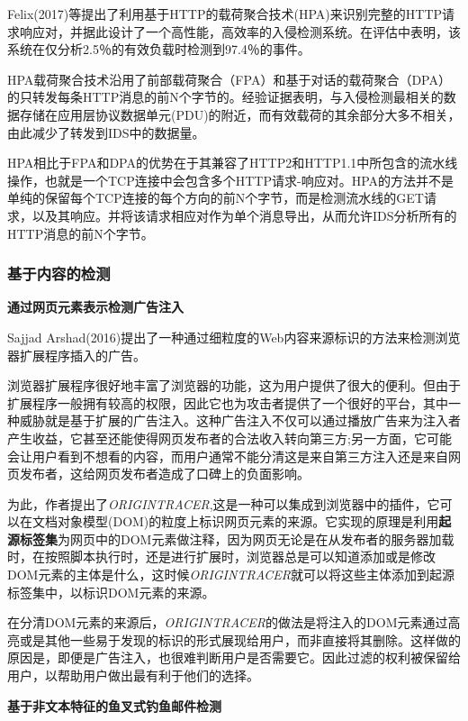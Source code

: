 \documentclass[12pt]{article} %
\begin{document}
Felix(2017)\cite{Felix}等提出了利用基于HTTP的载荷聚合技术(HPA)来识别完整的HTTP请求响应对，并据此设计了一个高性能，高效率的入侵检测系统。在评估中表明，该系统在仅分析2.5％的有效负载时检测到97.4％的事件。

HPA载荷聚合技术沿用了前部载荷聚合（FPA）和基于对话的载荷聚合（DPA）的只转发每条HTTP消息的前N个字节的。经验证据表明，与入侵检测最相关的数据存储在应用层协议数据单元(PDU)的附近，而有效载荷的其余部分大多不相关，由此减少了转发到IDS中的数据量。

HPA相比于FPA和DPA的优势在于其兼容了HTTP2和HTTP1.1中所包含的流水线操作，也就是一个TCP连接中会包含多个HTTP请求-响应对。HPA的方法并不是单纯的保留每个TCP连接的每个方向的前N个字节，而是检测流水线的GET请求，以及其响应。并将该请求相应对作为单个消息导出，从而允许IDS分析所有的HTTP消息的前N个字节。

\subsubsection{基于内容的检测}

\label{content}

\textbf{通过网页元素表示检测广告注入}

Sajjad Arshad(2016)\cite{Arshad}提出了一种通过细粒度的Web内容来源标识的方法来检测浏览器扩展程序插入的广告。

浏览器扩展程序很好地丰富了浏览器的功能，这为用户提供了很大的便利。但由于扩展程序一般拥有较高的权限，因此它也为攻击者提供了一个很好的平台，其中一种威胁就是基于扩展的广告注入。这种广告注入不仅可以通过播放广告来为注入者产生收益，它甚至还能使得网页发布者的合法收入转向第三方;另一方面，它可能会让用户看到不想看的内容，而用户通常不能分清这是来自第三方注入还是来自网页发布者，这给网页发布者造成了口碑上的负面影响。 %

为此，作者提出了\emph{ORIGINTRACER},这是一种可以集成到浏览器中的插件，它可以在文档对象模型(DOM)的粒度上标识网页元素的来源。它实现的原理是利用\textbf{起源标签集}为网页中的DOM元素做注释，因为网页无论是在从发布者的服务器加载时，在按照脚本执行时，还是进行扩展时，浏览器总是可以知道添加或是修改DOM元素的主体是什么，这时候\emph{ORIGINTRACER}就可以将这些主体添加到起源标签集中，以标识DOM元素的来源。

在分清DOM元素的来源后，\emph{ORIGINTRACER}的做法是将注入的DOM元素通过高亮或是其他一些易于发现的标识的形式展现给用户，而非直接将其删除。这样做的原因是，即便是广告注入，也很难判断用户是否需要它。因此过滤的权利被保留给用户，以帮助用户做出最有利于他们的选择。

\textbf{基于非文本特征的鱼叉式钓鱼邮件检测}
\end{document}
